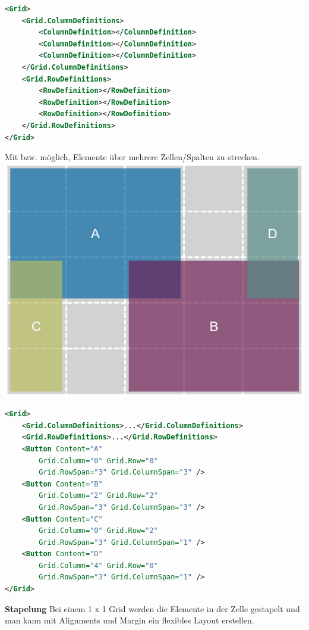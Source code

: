 \begin{lstlisting}[language=xml]
<Grid>
    <Grid.ColumnDefinitions>
        <ColumnDefinition></ColumnDefinition>
        <ColumnDefinition></ColumnDefinition>
        <ColumnDefinition></ColumnDefinition>
    </Grid.ColumnDefinitions>
    <Grid.RowDefinitions>
        <RowDefinition></RowDefinition>
        <RowDefinition></RowDefinition>
        <RowDefinition></RowDefinition>
    </Grid.RowDefinitions>
</Grid>
\end{lstlisting}
Mit  bzw.  möglich, Elemente über mehrere Zellen/Spalten zu strecken. \\
\includegraphics[scale=0.3]{img/rowspancolspan.png}
\begin{lstlisting}[language=xml]
<Grid>
    <Grid.ColumnDefinitions>...</Grid.ColumnDefinitions>
    <Grid.RowDefinitions>...</Grid.RowDefinitions>
    <Button Content="A"
        Grid.Column="0" Grid.Row="0"
        Grid.RowSpan="3" Grid.ColumnSpan="3" />
    <Button Content="B"
        Grid.Column="2" Grid.Row="2"
        Grid.RowSpan="3" Grid.ColumnSpan="3" />
    <Button Content="C"
        Grid.Column="0" Grid.Row="2"
        Grid.RowSpan="3" Grid.ColumnSpan="1" />
    <Button Content="D"
        Grid.Column="4" Grid.Row="0"
        Grid.RowSpan="3" Grid.ColumnSpan="1" />
</Grid>
\end{lstlisting}
\textbf{Stapelung} Bei einem 1 x 1 Grid werden die Elemente in der Zelle gestapelt und man kann mit Alignments und Margin ein flexibles Layout erstellen.
